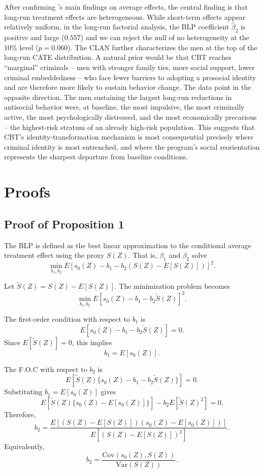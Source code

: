 \documentclass[11pt]{article}
\begin{document}
After confirming \citet{blattman2017}'s main findings on average effects, 
the central finding is that long-run treatment effects are heterogeneous. While short-term effects appear relatively uniform, in the long-run factorial analysis, the BLP coefficient $\hat\beta_2$ is positive and large ($0.557$) and we can reject the null of no heterogeneity at the 10\% level ($p = 0.060$).  The CLAN further characterizes the men at the top of the long-run CATE distribution. A natural prior would be that CBT reaches ``marginal'' criminals -- men with stronger family ties, more social support, lower criminal embeddedness -- who face fewer barriers to adopting a prosocial identity and are therefore more likely to sustain behavior change. The data point in the opposite direction. The men sustaining the largest long-run reductions in antisocial behavior were, at baseline, the most impulsive, the most criminally active, the most psychologically distressed, and the most economically precarious -- the highest-risk stratum of an already high-risk population. This suggests that CBT's identity-transformation mechanism is most consequential precisely where criminal identity is most entrenched, and where the program's social reorientation represents the sharpest departure from baseline conditions.

\pagebreak 
\appendix

\section{Proofs}

\subsection{Proof of Proposition 1}

The BLP is defined as the best linear approximation to the conditional average treatment effect using the proxy $S(Z)$. That is, $\beta_1$ and $\beta_2$ solve
\[
\min_{b_1,b_2}
E\left[
s_0(Z)-b_1-b_2(S(Z)-E[S(Z)])
\right]^2.
\]

Let $\tilde S(Z)=S(Z)-E[S(Z)]$. The minimization problem becomes
\[
\min_{b_1,b_2}
E\left[
s_0(Z)-b_1-b_2\tilde S(Z)
\right]^2.
\]

The first-order condition with respect to $b_1$ is
\[
E\left[
s_0(Z)-b_1-b_2\tilde S(Z)
\right]=0.
\]
Since $E[\tilde S(Z)]=0$, this implies
\[
b_1=E[s_0(Z)].
\]

The F.O.C with respect to $b_2$ is
\[
E\left[
\tilde S(Z)\{s_0(Z)-b_1-b_2\tilde S(Z)\}
\right]=0.
\]
Substituting $b_1=E[s_0(Z)]$ gives
\[
E\left[
\tilde S(Z)\{s_0(Z)-E[s_0(Z)]\}
\right]
-
b_2E[\tilde S(Z)^2]
=0.
\]
Therefore,
\[
b_2=
\frac{
E\left[(S(Z)-E[S(Z)])(s_0(Z)-E[s_0(Z)])\right]
}{
E\left[(S(Z)-E[S(Z)])^2\right]
}.
\]
Equivalently,
\[
b_2=
\frac{\mathrm{Cov}(s_0(Z),S(Z))}
{\mathrm{Var}(S(Z))}.
\]
\end{document}
